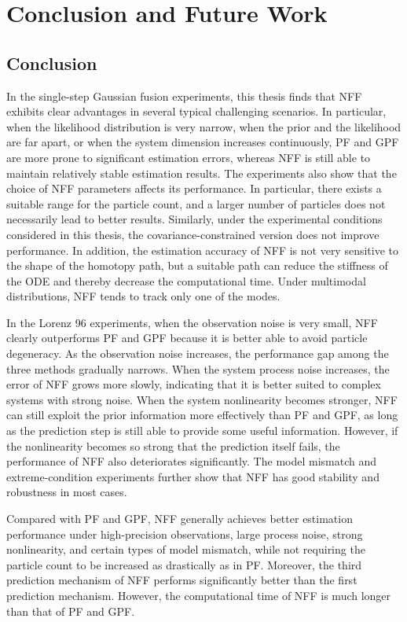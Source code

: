 \chapter{Conclusion and Future Work}
\label{chap:conclusion}
\section{Conclusion}
In the single-step Gaussian fusion experiments, this thesis finds that NFF exhibits clear advantages in several typical challenging scenarios. In particular, when the likelihood distribution is very narrow, when the prior and the likelihood are far apart, or when the system dimension increases continuously, PF and GPF are more prone to significant estimation errors, whereas NFF is still able to maintain relatively stable estimation results. The experiments also show that the choice of NFF parameters affects its performance. In particular, there exists a suitable range for the particle count, and a larger number of particles does not necessarily lead to better results. Similarly, under the experimental conditions considered in this thesis, the covariance-constrained version does not improve performance. In addition, the estimation accuracy of NFF is not very sensitive to the shape of the homotopy path, but a suitable path can reduce the stiffness of the ODE and thereby decrease the computational time. Under multimodal distributions, NFF tends to track only one of the modes.

In the Lorenz 96 experiments, when the observation noise is very small, NFF clearly outperforms PF and GPF because it is better able to avoid particle degeneracy. As the observation noise increases, the performance gap among the three methods gradually narrows. When the system process noise increases, the error of NFF grows more slowly, indicating that it is better suited to complex systems with strong noise. When the system nonlinearity becomes stronger, NFF can still exploit the prior information more effectively than PF and GPF, as long as the prediction step is still able to provide some useful information. However, if the nonlinearity becomes so strong that the prediction itself fails, the performance of NFF also deteriorates significantly. The model mismatch and extreme-condition experiments further show that NFF has good stability and robustness in most cases.

Compared with PF and GPF, NFF generally achieves better estimation performance under high-precision observations, large process noise, strong nonlinearity, and certain types of model mismatch, while not requiring the particle count to be increased as drastically as in PF. Moreover, the third prediction mechanism of NFF performs significantly better than the first prediction mechanism. However, the computational time of NFF is much longer than that of PF and GPF.

